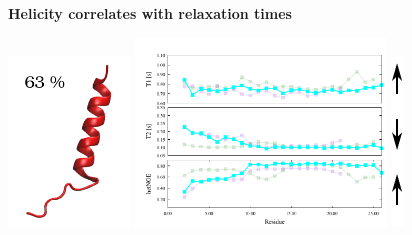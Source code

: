\addtocounter{framenumber}{-1}
\begin{frame}
\LARGE{\centering
\textbf{Helicity correlates with relaxation times} \\}
\begin{center}
 \includegraphics[height=4.5cm]{plots/helix3.pdf}
 \includegraphics[height=5cm]{plots/simul_helix13.pdf}
 \includegraphics[height=4.5cm]{plots/arrows.pdf}
\end{center}
\end{frame}



